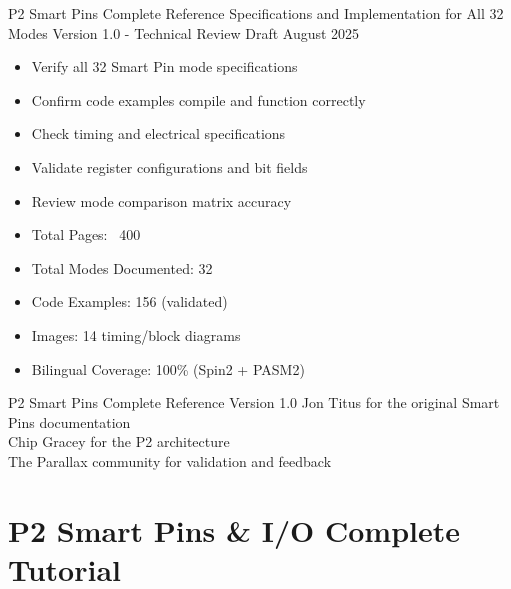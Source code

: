 \documentclass[11pt,a4paper,oneside,english]{book}
\begin{document}
\technicalreviewtitlepage%
{P2 Smart Pins Complete Reference}%
{Specifications and Implementation for All 32 Modes}%
{Version 1.0 - Technical Review Draft}%
{August 2025}%
{%
\begin{itemize}
  \item Verify all 32 Smart Pin mode specifications
  \item Confirm code examples compile and function correctly
  \item Check timing and electrical specifications
  \item Validate register configurations and bit fields
  \item Review mode comparison matrix accuracy
\end{itemize}%
}%
{%
\begin{itemize}
  \item Total Pages: ~400
  \item Total Modes Documented: 32
  \item Code Examples: 156 (validated)
  \item Images: 14 timing/block diagrams
  \item Bilingual Coverage: 100\% (Spin2 + PASM2)
\end{itemize}%
}

\technicalreviewcopyrightpage%
{P2 Smart Pins Complete Reference}%
{Version 1.0}%
{%
Jon Titus for the original Smart Pins documentation\\
Chip Gracey for the P2 architecture\\
The Parallax community for validation and feedback%
}

\tableofcontents
\clearpage
\markboth{}{}  %

\clearpage

\hypertarget{p2-smart-pins-io-complete-tutorial}{%
\part{P2 Smart Pins \& I/O Complete
Tutorial}\label{p2-smart-pins-io-complete-tutorial}}
\end{document}
